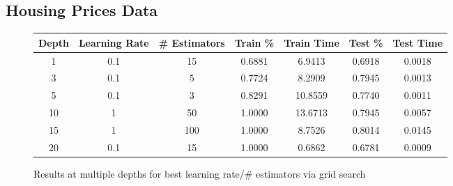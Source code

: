 \documentclass[h]{article}
\begin{document}
\subsection*{Housing Prices Data}
\begin{figure}[H]
\begin{tabular}{ | c | c  | c | c | c | c | c |} 
\hline
\textbf{Depth} & \textbf{Learning Rate} & \textbf{\# Estimators} & \textbf{Train \%} & \textbf{Train Time} & \textbf{Test \%} & \textbf{Test Time}   \\
\hline
1 & 0.1 & 15 & 0.6881 & 6.9413 & 0.6918 & 0.0018 \\ \hline
3 & 0.1 & 5 & 0.7724 & 8.2909 & 0.7945 & 0.0013 \\ \hline
5 & 0.1 & 3 & 0.8291 & 10.8559 & 0.7740 & 0.0011 \\ \hline
10 & 1 & 50 & 1.0000 & 13.6713 & 0.7945 & 0.0057 \\ \hline
15 & 1 & 100 & 1.0000 & 8.7526 & 0.8014 & 0.0145 \\ \hline
20 & 0.1 & 15 & 1.0000 & 0.6862 & 0.6781 & 0.0009 \\ \hline

\end{tabular}
\caption*{Results at multiple depths for best learning rate/# estimators via grid search}
\endminipage\hfill

\end{figure}
\end{document}
